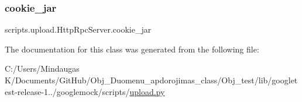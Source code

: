 \mbox{\label{classscripts_1_1upload_1_1_http_rpc_server_a9f588f07168174b11c82388d58c40137}} 
\subsubsection{\texorpdfstring{cookie\_jar}{cookie\_jar}}
{\footnotesize\ttfamily scripts.\+upload.\+Http\+Rpc\+Server.\+cookie\+\_\+jar}



The documentation for this class was generated from the following file\+:\begin{DoxyCompactItemize}
\item 
C\+:/\+Users/\+Mindaugas K/\+Documents/\+Git\+Hub/\+Obj\+\_\+\+Duomenu\+\_\+apdorojimas\+\_\+class/\+Obj\+\_\+test/lib/googletest-\/release-\/1../googlemock/scripts/\mbox{\hyperlink{_obj__test_2lib_2googletest-release-1_88_81_2googlemock_2scripts_2upload_8py}{upload.\+py}}\end{DoxyCompactItemize}
